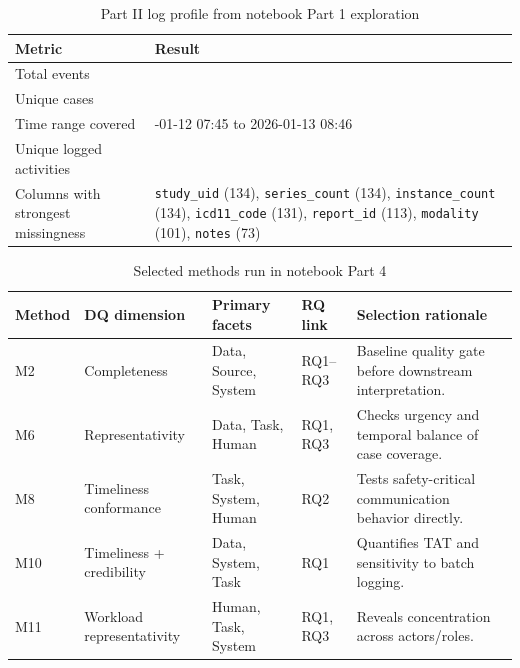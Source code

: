\begin{table}[H]
\centering
\footnotesize
\caption{Part II log profile from notebook Part 1 exploration}
\label{tab:d5_log_profile}
\begin{tabularx}{\textwidth}{
>{\raggedright\arraybackslash}p{}
>{\raggedright\arraybackslash}X
}
\toprule
Metric & Result \\
\midrule
Total events & 150 \\
Unique cases & 17 \\
Time range covered & 2026-01-12 07:45 to 2026-01-13 08:46 \\
Unique logged activities & 12 \\
Columns with strongest missingness & \texttt{study\_uid} (134), \texttt{series\_count} (134), \texttt{instance\_count} (134), \texttt{icd11\_code} (131), \texttt{report\_id} (113), \texttt{modality} (101), \texttt{notes} (73) \\
\bottomrule
\end{tabularx}
\end{table}

\begin{table}[H]
\centering
\footnotesize
\caption{Selected methods run in notebook Part 4}
\label{tab:d5_method_selection}
\begin{tabularx}{\textwidth}{
>{\raggedright\arraybackslash}p{}
>{\raggedright\arraybackslash}p{}
>{\raggedright\arraybackslash}p{}
>{\raggedright\arraybackslash}p{}
>{\raggedright\arraybackslash}X
}
\toprule
Method & DQ dimension & Primary facets & RQ link & Selection rationale \\
\midrule
M2 & Completeness & Data, Source, System & RQ1--RQ3 & Baseline quality gate before downstream interpretation. \\
M6 & Representativity & Data, Task, Human & RQ1, RQ3 & Checks urgency and temporal balance of case coverage. \\
M8 & Timeliness conformance & Task, System, Human & RQ2 & Tests safety-critical communication behavior directly. \\
M10 & Timeliness + credibility & Data, System, Task & RQ1 & Quantifies TAT and sensitivity to batch logging. \\
M11 & Workload representativity & Human, Task, System & RQ1, RQ3 & Reveals concentration across actors/roles. \\
\bottomrule
\end{tabularx}
\end{table}

